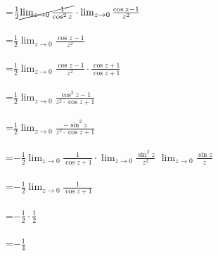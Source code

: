 \documentclass{article}
\theoremstyle{mytheoremstyle}
\theoremstyle{mytheoremstyle}
\theoremstyle{myproblemstyle}
\begin{document}
=$\frac{1}{2}\cancel{\lim_{z\to 0} \frac{1}{\cos ^2 z}}\cdot \lim_{z\to 0} \frac{\cos z -1}{z^2}$\\
\\

=$\frac{1}{2}\lim_{z\to 0} \frac{\cos z -1}{z^2}$\\
\\

=$\frac{1}{2}\lim_{z\to 0} \frac{\cos z -1}{z^2}\cdot \frac{\cos z +1}{\cos z +1}$\\
\\

=$\frac{1}{2}\lim_{z\to 0} \frac{\cos ^2 z -1}{z^2\cdot \cos z +1}$\\
\\

=$\frac{1}{2}\lim_{z\to 0} \frac{-\sin ^2 z}{z^2\cdot \cos z +1}$\\
\\

=$-\frac{1}{2}\lim_{z\to 0} \frac{1}{\cos z +1}\cdot \lim_{z\to 0} \frac{\sin ^2 z}{z^2}$ \hspace{70} $\lim_{z\to 0} \frac{\sin z}{z}$\\
\\

=$-\frac{1}{2}\lim_{z\to 0} \frac{1}{\cos z +1}$\\
\\

=$-\frac{1}{2} \cdot \frac{1}{2}$\\
\\

=$-\frac{1}{4}$
\end{document}
